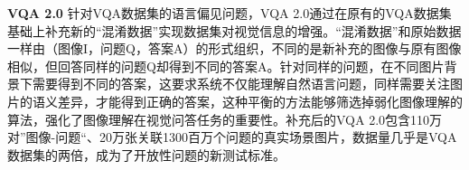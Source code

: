 

\textbf{VQA 2.0}\qquad
针对VQA数据集的语言偏见问题，VQA 2.0通过在原有的VQA数据集基础上补充新的“混淆数据”实现数据集对视觉信息的增强。“混淆数据”和原始数据一样由（图像I，问题Q，答案A）的形式组织，不同的是新补充的图像与原有图像相似，但回答同样的问题Q却得到不同的答案A。针对同样的问题，在不同图片背景下需要得到不同的答案，这要求系统不仅能理解自然语言问题，同样需要关注图片的语义差异，才能得到正确的答案，这种平衡的方法能够筛选掉弱化图像理解的算法，强化了图像理解在视觉问答任务的重要性。补充后的VQA 2.0包含110万对”图像-问题“、20万张关联1300百万个问题的真实场景图片，数据量几乎是VQA数据集的两倍，成为了开放性问题的新测试标准。

